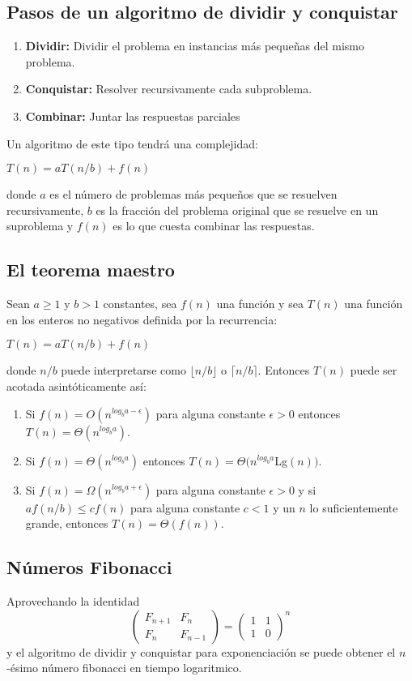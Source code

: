 \begin{multicols}{2}
\subsection{Pasos de un algoritmo de dividir y conquistar}
\begin{enumerate}
	\item \textbf{Dividir:} Dividir el problema en instancias m\'as peque\~{n}as del mismo problema.
	\item \textbf{Conquistar:} Resolver recursivamente cada subproblema.
	\item \textbf{Combinar:} Juntar las respuestas parciales
\end{enumerate}
Un algoritmo de este tipo tendr\'a una complejidad:
\begin{center} $T(n)=aT(n/b)+f(n)$ \end{center}
donde $a$ es el n\'umero de problemas m\'as peque\~{n}os que se resuelven recursivamente, $b$ es la fracci\'on del problema original que se resuelve en un suproblema y $f(n)$ es lo que cuesta combinar las respuestas.
\subsection{El teorema maestro}
Sean $a\geq 1$ y $b>1$ constantes, sea $f(n)$ una funci\'on y sea $T(n)$ una funci\'on en los enteros no negativos definida por la recurrencia:
\begin{center} $T(n)=aT(n/b)+f(n)$ \end{center}
donde $n/b$ puede interpretarse como $\lfloor n/b \rfloor$ o $\lceil n/b \rceil$. Entonces $T(n)$ puede ser acotada asint\'oticamente as\'i:
\begin{enumerate}
	\item Si $f(n)= O(n^{log_ba-\epsilon})$ para alguna constante $\epsilon>0$ entonces \\$T(n)=\Theta(n^{log_ba})$.
	\item Si $f(n)= \Theta(n^{log_ba})$ entonces $T(n)=\Theta(n^{log_ba}$Lg$(n))$.
	\item Si $f(n)= \Omega(n^{log_ba+\epsilon})$ para alguna constante $\epsilon>0$ y si $af(n/b)\leq cf(n)$ para alguna constante $c<1$ y un $n$ lo suficientemente grande, entonces $T(n)=\Theta(f(n))$.
\end{enumerate}
\subsection{N\'umeros Fibonacci}
Aprovechando la identidad 
\[
\begin{pmatrix}
  F_{n+1} & F_n \\
  F_n & F_{n-1}
\end{pmatrix}
 =
\begin{pmatrix}
  1 & 1 \\
  1 & 0
\end{pmatrix}^n
\]
y el algoritmo de dividir y conquistar para exponenciaci\'on se puede obtener el $n$-\'esimo n\'umero fibonacci en tiempo logaritmico.

\end{multicols}
